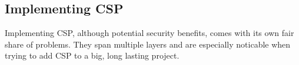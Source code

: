 \documentclass[11]{article}   %
\begin{document}

\subsection{Implementing CSP}
Implementing CSP, although potential security benefits, comes with its own fair share of problems. 
They span multiple layers and are especially noticable when trying to add CSP to a big, long lasting project.





%
%
%
\end{document}
